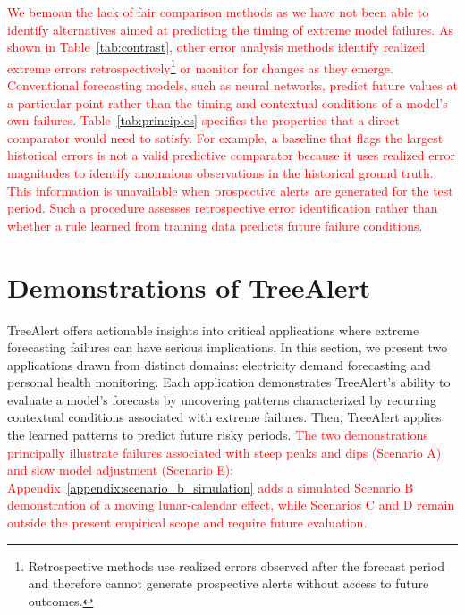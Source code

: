 \documentclass[]{interact}
\newcommand{\matt}[1]{\textcolor{red}{#1}}
\theoremstyle{definition}
\begin{document}
\matt{We bemoan the lack of fair comparison methods as we have not been able to identify alternatives aimed at predicting the timing of extreme model failures.  As shown in Table~\ref{tab:contrast}, other error analysis methods identify realized extreme errors retrospectively\footnote{Retrospective methods use realized errors observed after the forecast period and therefore cannot generate prospective alerts without access to future outcomes.} or monitor for changes as they emerge. Conventional forecasting models, such as neural networks, predict future values at a particular point rather than the timing and contextual conditions of a model's own failures. Table~\ref{tab:principles} specifies the properties that a direct comparator would need to satisfy. For example, a baseline that flags the largest historical errors is not a valid predictive comparator because it uses realized error magnitudes to identify anomalous observations in the historical ground truth. This information is unavailable when prospective alerts are generated for the test period. Such a procedure assesses retrospective error identification rather than whether a rule learned from training data predicts future failure conditions.}

\section{Demonstrations of TreeAlert}
\label{sec-demo}

TreeAlert offers actionable insights into critical applications where extreme forecasting failures can have serious implications. In this section, we present two applications drawn from distinct domains: electricity demand forecasting and personal health monitoring. 
Each application demonstrates TreeAlert's ability  to evaluate a model's forecasts by uncovering patterns characterized by recurring contextual conditions associated with extreme failures. Then, TreeAlert applies the learned patterns to predict future risky periods. \matt{The two demonstrations principally illustrate failures associated with steep peaks and dips (Scenario A) and slow model adjustment (Scenario E); Appendix~\ref{appendix:scenario_b_simulation} adds a simulated Scenario B demonstration of a moving lunar-calendar effect, while Scenarios C and D remain outside the present empirical scope and require future evaluation.}%
\end{document}
